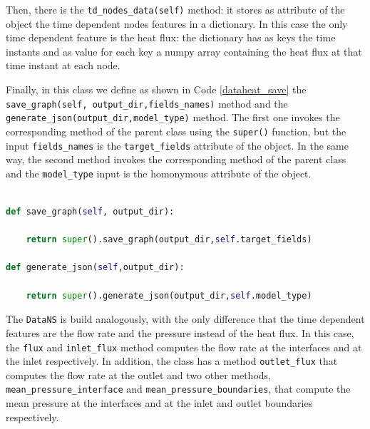 \documentclass[11pt,a4paper]{article}
\begin{document}
Then, there is the \texttt{td\_nodes\_data(self)} method: it stores as attribute of the object the time dependent nodes features in a dictionary. In this case the only time dependent feature is the heat flux: the dictionary has as keys the time instants and as value for each key a numpy array containing the heat flux at that time instant at each node.

Finally, in this class we define as shown in Code \ref{dataheat_save} the \texttt{save\_graph(self, output\_dir,fields\_names)} method and the \texttt{generate\_json(output\_dir,model\_type)} method. The first one invokes the corresponding method of the parent class using the \texttt{super()} function, but the input \texttt{fields\_names} is the \texttt{target\_fields} attribute of the object. In the same way, the second method invokes the corresponding method of the parent class and the \texttt{model\_type} input is the homonymous attribute of the object.

\begin{lstlisting}[language=Python, caption={Definition of the \texttt{save\_graph} and \texttt{generate\_json} methods of the \texttt{DataHeat} class.}, label={dataheat_save}]
    
def save_graph(self, output_dir):

    return super().save_graph(output_dir,self.target_fields)

def generate_json(self,output_dir):

    return super().generate_json(output_dir,self.model_type)
\end{lstlisting}

The \texttt{DataNS} is build analogously, with the only difference that the time dependent features are the flow rate and the pressure instead of the heat flux. In this case, the \texttt{flux} and \texttt{inlet\_flux} method computes the flow rate at the interfaces and at the inlet respectively. In addition, the class has a method \texttt{outlet\_flux} that computes the flow rate at the outlet and two other methods, \texttt{mean\_pressure\_interface} and \texttt{mean\_pressure\_boundaries}, that compute the mean pressure at the interfaces and at the inlet and outlet boundaries respectively.
\end{document}
